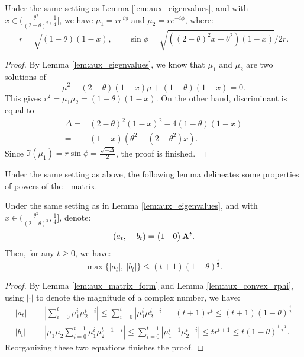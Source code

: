 \begin{lemma}\label{lem:aux_convex_rphi}
Under the same setting as Lemma \ref{lem:aux_eigenvalues}, and 
with $x \in (\frac{\theta^2}{(2-\theta)^2}, \frac{1}{4}]$, we have
$\mu_1 = r e^{i\phi}$ and $\mu_2 = r e^{-i\phi}$, where:
\begin{equation*}
r = \sqrt{(1-\theta)(1-x)}, \quad\quad \sin{\phi} = \sqrt{((2-\theta)^2x - \theta^2)(1-x)}/2r.
\end{equation*}
\end{lemma}
\begin{proof}
By Lemma \ref{lem:aux_eigenvalues}, we know that $\mu_1$ and $\mu_2$ 
are two solutions of 
\begin{equation*}
\mu^2 - (2-\theta)(1-x)\mu + (1-\theta)(1-x) = 0.
\end{equation*}
This gives $r^2 = \mu_1\mu_2 = (1-\theta)(1-x)$. 
On the other hand, discriminant is equal to
\begin{align*}
\Delta =& (2-\theta)^2(1-x)^2 - 4(1-\theta)(1-x) \\
=& (1-x)(\theta^2 - (2-\theta^2)x).
\end{align*}
Since $\Im(\mu_1) = r \sin \phi = \frac{\sqrt{-\Delta}}{2}$, 
the proof is finished.
\end{proof}

Under the same setting as above, the following lemma delineates some 
properties of powers of the~\nag~matrix.
\begin{lemma}\label{lem:aux_convex_entry}
Under the same setting as in Lemma \ref{lem:aux_eigenvalues}, 
and with $x \in (\frac{\theta^2}{(2-\theta)^2}, \frac{1}{4}]$, denote:
\begin{equation*}
(a_t, ~-b_t) = \begin{pmatrix} 1 & 0  \end{pmatrix} \mathbf{A}^t.
\end{equation*}
Then, for any $t\ge 0$, we have:
\begin{equation*}
\max\{|a_t|, ~|b_t|\} \le (t+1) (1-\theta)^{\frac{t}{2}}.
\end{equation*}
\end{lemma}

\begin{proof}
By Lemma \ref{lem:aux_matrix_form} and Lemma \ref{lem:aux_convex_rphi}, 
using $|\cdot|$ to denote the magnitude of a complex number, we have:
\begin{align*}
|a_t| =& \left|\sum_{i=0}^t \mu_1^i \mu_2^{t-i}\right|
\le \sum_{i=0}^t |\mu_1^i \mu_2^{t-i}| = (t+1)r^{t} \le (t+1)(1-\theta)^{\frac{t}{2}} \\
|b_t| =& \left|\mu_1\mu_2\sum_{i=0}^{t-1} \mu_1^{i} \mu_2^{t-1-i}\right|
\le \sum_{i=0}^{t-1} |\mu_1^{i+1}\mu_2^{t-i}|
\le t r^{t+1} \le t (1-\theta)^{\frac{t+1}{2}}.
\end{align*}
Reorganizing these two equations finishes the proof.
\end{proof}

